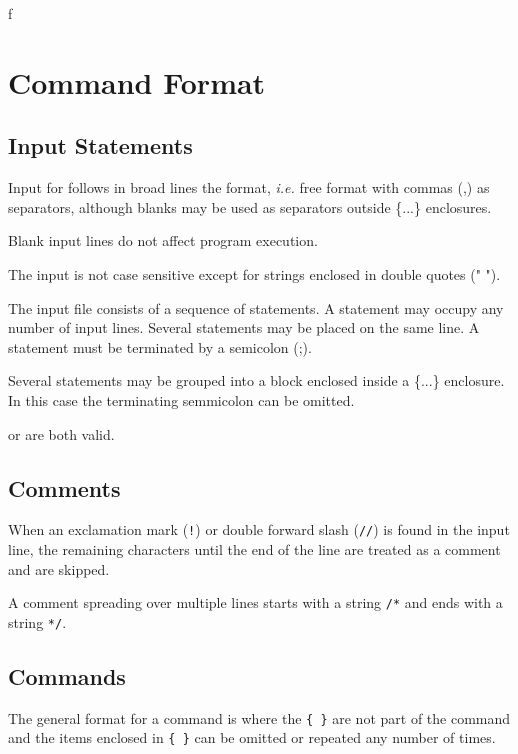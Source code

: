 f%

\chapter{Command Format}


\section{Input Statements}

Input for \madx follows in broad lines the
\href{http://cern.ch/mad9}{\madnine} format, \textsl{i.e.} 
free format with commas (,) as separators, although blanks may be used as
separators outside \{...\} enclosures. 

Blank input lines do not affect program execution. 

The input is not case sensitive except for strings enclosed in double
quotes (" "). 

The input file consists of a sequence of statements. 
A statement may occupy any number of input lines. 
Several statements may be placed on the same line.
A statement must be terminated by a semicolon (;).

Several statements may be grouped into a block enclosed inside a \{...\}
enclosure. In this case the terminating semmicolon can be omitted.

or
are both valid.

\section{Comments}
When an exclamation mark (\texttt{!}) or double forward slash (\texttt{//}) is
found in the input line, the remaining characters until the end of the
line are treated as a comment and are skipped. 

A comment spreading over multiple lines starts with a string \texttt{/*}
and ends with a string \texttt{*/}.

\section{Commands}
The general format for a command is 
where the  \texttt{\{ \}} are not part of the command and the items
enclosed in \texttt{\{ \}} can be omitted or repeated any number of times. 


